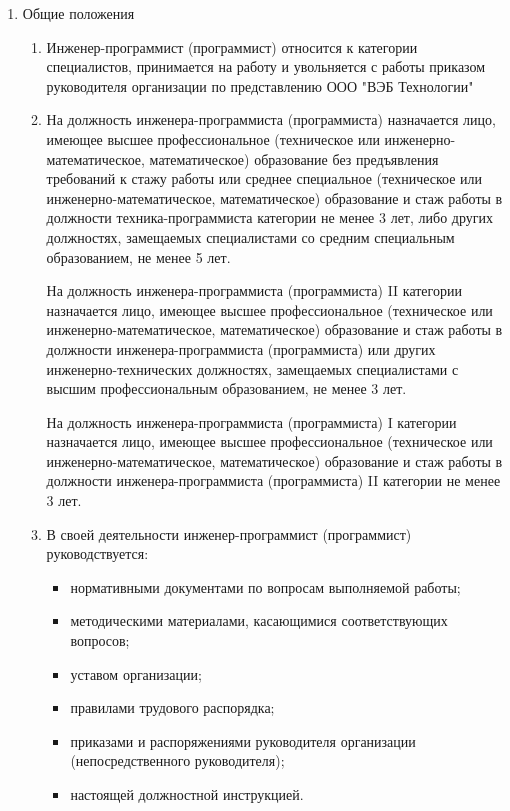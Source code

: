 \documentclass[12pt,a4paper,draft]{belgost/belgost}
\begin{document}
\begin{enumerate}
    \item Общие положения
    \begin{enumerate}
        \item Инженер-программист (программист) относится к категории специалистов, принимается на работу и увольняется с работы приказом руководителя организации по представлению ООО "ВЭБ Технологии"
        
        \item На должность инженера-программиста (программиста) назначается лицо, имеющее высшее профессиональное (техническое или инженерно-математическое, математическое) образование без предъявления требований к стажу работы или среднее специальное (техническое или инженерно-математическое, математическое) образование и стаж работы в должности техника-программиста категории не менее 3 лет, либо других должностях, замещаемых специалистами со средним специальным образованием, не менее 5 лет.

        На должность инженера-программиста (программиста) II категории назначается лицо, имеющее высшее профессиональное (техническое или инженерно-математическое, математическое) образование и стаж работы в должности инженера-программиста (программиста) или других инженерно-технических должностях, замещаемых специалистами с высшим профессиональным образованием, не менее 3 лет.
    
        На должность инженера-программиста (программиста) I категории назначается лицо, имеющее высшее профессиональное (техническое или инженерно-математическое, математическое) образование и стаж работы в должности инженера-программиста (программиста) II категории не менее 3 лет.

        \item В своей деятельности инженер-программист (программист) руководствуется:
        \begin{itemize}
            \item нормативными документами по вопросам выполняемой работы;
            \item методическими материалами, касающимися соответствующих вопросов;
            \item уставом организации;
            \item правилами трудового распорядка;
            \item приказами и распоряжениями руководителя организации (непосредственного руководителя);
            \item настоящей должностной инструкцией.
        \end{itemize}
        

\end{enumerate}
\end{enumerate}
\end{document}
